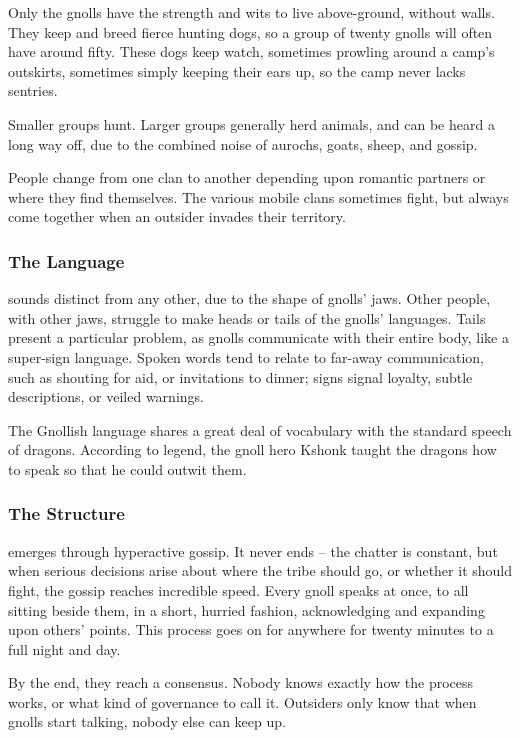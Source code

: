 \begin{multicols}{2}
\renewcommand\npcsymbol{\Nl}

\noindent
Only the gnolls have the strength and wits to live above-ground, without walls.
They keep and breed fierce hunting dogs, so a group of twenty gnolls will often have around fifty.
These dogs keep watch, sometimes prowling around a camp's outskirts, sometimes simply keeping their ears up, so the camp never lacks sentries.

Smaller groups hunt.
Larger groups generally herd animals, and can be heard a long way off, due to the combined noise of aurochs, goats, sheep, and gossip.

People change from one clan to another depending upon romantic partners or where they find themselves.
The various mobile clans sometimes fight, but always come together when an outsider invades their territory.

\subsubsection{The Language}
sounds distinct from any other, due to the shape of gnolls' jaws.
Other people, with other jaws, struggle to make heads or tails of the gnolls' languages.
Tails present a particular problem, as gnolls communicate with their entire body, like a super-sign language.
Spoken words tend to relate to far-away communication, such as shouting for aid, or invitations to dinner; signs signal loyalty, subtle descriptions, or veiled warnings.

The Gnollish language shares a great deal of vocabulary with the standard speech of dragons.
According to legend, the gnoll hero Kshonk taught the dragons how to speak so that he could outwit them.

\subsubsection{The Structure}
emerges through hyperactive gossip.
It never ends -- the chatter is constant, but when serious decisions arise about where the tribe should go, or whether it should fight, the gossip reaches incredible speed.
Every gnoll speaks at once, to all sitting beside them, in a short, hurried fashion, acknowledging and expanding upon others' points.
This process goes on for anywhere for twenty minutes to a full night and day.

By the end, they reach a consensus.
Nobody knows exactly how the process works, or what kind of governance to call it.
Outsiders only know that when gnolls start talking, nobody else can keep up.


\end{multicols}
